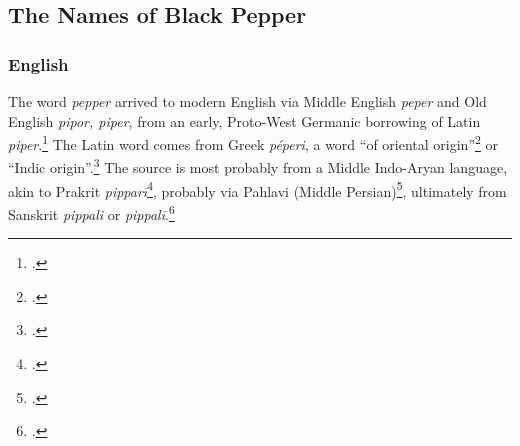 
\subsection{The Names of Black Pepper}

\subsubsection{English}



The word \textit{pepper} arrived to modern English via Middle English \textit{peper} and Old English \textit{pipor, piper}, from an early, Proto-West Germanic borrowing of Latin \textit{piper}.\footcite[pepper]{oed} The Latin word comes from Greek  \textit{péperi}, a word ``of oriental origin''\footcite[pepper]{hoad_concise_2003} or ``Indic origin''.\footcite[pepper]{ahd} The source is most probably from a Middle Indo-Aryan language, akin to Prakrit \textit{pipparī}\footcite[599]{sheth_paia-sadda-mahannavo_1923}, probably via Pahlavi (Middle Persian)\footcite[pepper]{oe}, ultimately from Sanskrit \textit{pippali} or \textit{pippalī}.\footcite[628 ]{monier-williams_sanskrit-english_1899}

